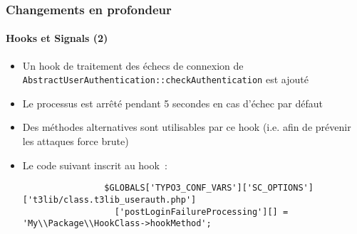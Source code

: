 \begin{frame}[fragile]
	\frametitle{Changements en profondeur}
	\framesubtitle{Hooks et Signals (2)}

	\lstset{basicstyle=\tiny\ttfamily}

	\begin{itemize}

		\item Un hook de traitement des échecs de connexion de \texttt{AbstractUserAuthentication::checkAuthentication}
			est ajouté

		\item Le processus est arrêté pendant 5 secondes en cas d'échec par défaut

		\item Des méthodes alternatives sont utilisables par ce hook
			(i.e. afin de prévenir les attaques force brute)

		\item Le code suivant inscrit au hook~:

			\begin{lstlisting}
				$GLOBALS['TYPO3_CONF_VARS']['SC_OPTIONS']['t3lib/class.t3lib_userauth.php']
				  ['postLoginFailureProcessing'][] = 'My\\Package\\HookClass->hookMethod';
			\end{lstlisting}

	\end{itemize}

\end{frame}



